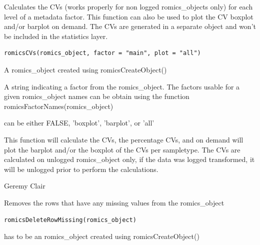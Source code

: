 \documentclass[a4paper]{book}
\begin{document}
%
\begin{Description}
Calculates the CVs (works properly for non logged romics\_objects only) for each level of a metadata factor. This function can also be used to plot the CV boxplot and/or barplot on demand. The CVs are generated in a separate object and won’t be included in the statistics layer.
\end{Description}
%
\begin{Usage}
\begin{verbatim}
romicsCVs(romics_object, factor = "main", plot = "all")
\end{verbatim}
\end{Usage}
%
\begin{Arguments}
\begin{ldescription}
\item[\code{romics\_object}] A romics\_object created using romicsCreateObject()

\item[\code{factor}] A string indicating a factor from the romics\_object. The factors usable for a given romics\_object names can be obtain using the function romicsFactorNames(romics\_object)

\item[\code{plot}] can be either FALSE, 'boxplot', 'barplot', or 'all'
\end{ldescription}
\end{Arguments}
%
\begin{Details}
This function will calculate the CVs, the percentage CVs, and on demand will plot the barplot and/or the boxplot of the CVs per sampletype. The CVs are calculated on unlogged romics\_object only, if the data was logged transformed, it will be unlogged prior to perform the calculations.
\end{Details}
%
\begin{Author}
Geremy Clair
\end{Author}
%
\begin{Description}
Removes the rows that have any missing values from the romics\_object
\end{Description}
%
\begin{Usage}
\begin{verbatim}
romicsDeleteRowMissing(romics_object)
\end{verbatim}
\end{Usage}
%
\begin{Arguments}
\begin{ldescription}
\item[\code{romics\_object}] has to be an romics\_object created using romicsCreateObject()
\end{ldescription}
\end{Arguments}
\end{document}
